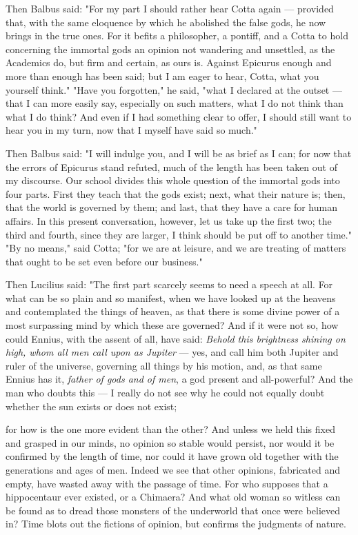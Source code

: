  Then Balbus said: "For my part I should rather hear Cotta again — provided that, with the same eloquence by which he abolished the false gods, he now brings in the true ones. For it befits a philosopher, a pontiff, and a Cotta to hold concerning the immortal gods an opinion not wandering and unsettled, as the Academics do, but firm and certain, as ours is. Against Epicurus enough and more than enough has been said; but I am eager to hear, Cotta, what you yourself think." "Have you forgotten," he said, "what I declared at the outset — that I can more easily say, especially on such matters, what I do not think than what I do think? And even if I had something clear to offer, I should still want to hear you in my turn, now that I myself have said so much."

 Then Balbus said: "I will indulge you, and I will be as brief as I can; for now that the errors of Epicurus stand refuted, much of the length has been taken out of my discourse. Our school divides this whole question of the immortal gods into four parts. First they teach that the gods exist; next, what their nature is; then, that the world is governed by them; and last, that they have a care for human affairs. In this present conversation, however, let us take up the first two; the third and fourth, since they are larger, I think should be put off to another time." "By no means," said Cotta; "for we are at leisure, and we are treating of matters that ought to be set even before our business."

 Then Lucilius said: "The first part scarcely seems to need a speech at all. For what can be so plain and so manifest, when we have looked up at the heavens and contemplated the things of heaven, as that there is some divine power of a most surpassing mind by which these are governed? And if it were not so, how could Ennius, with the assent of all, have said: \textit{Behold this brightness shining on high, whom all men call upon as Jupiter} — yes, and call him both Jupiter and ruler of the universe, governing all things by his motion, and, as that same Ennius has it, \textit{father of gods and of men}, a god present and all-powerful? And the man who doubts this — I really do not see why he could not equally doubt whether the sun exists or does not exist;

 for how is the one more evident than the other? And unless we held this fixed and grasped in our minds, no opinion so stable would persist, nor would it be confirmed by the length of time, nor could it have grown old together with the generations and ages of men. Indeed we see that other opinions, fabricated and empty, have wasted away with the passage of time. For who supposes that a hippocentaur ever existed, or a Chimaera? And what old woman so witless can be found as to dread those monsters of the underworld that once were believed in? Time blots out the fictions of opinion, but confirms the judgments of nature.

